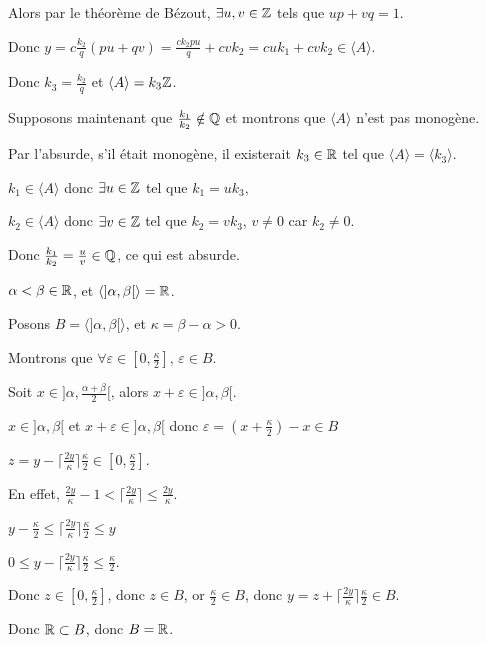 \begin{exemple}
    Alors par le théorème de Bézout, $\exists u, v \in \mathbb{Z}$ tels que $up + vq = 1$.

    Donc $\displaystyle y = c \frac{k_2} q (pu + qv) = \frac{c k_2 p u}{q} + cv k_2 = c u k_1 + cv k_2 \in \langle A \rangle$.

    Donc $k_3 = \frac{k_2} q$ et $\langle A \rangle = k_3 \mathbb{Z}$.

    \svspace Supposons maintenant que $\frac{k_1}{k_2} \notin \mathbb{Q}$ et montrons 
    que $\langle A \rangle$ n'est pas monogène.

    Par l'absurde, s'il était monogène, il existerait $k_3 \in \mathbb{R}$ tel que
    $\langle A \rangle = \langle k_3 \rangle$. 

    $k_1 \in \langle A \rangle$ donc $\exists u \in \mathbb{Z}$ tel que $k_1 = u k_3$, 

    $k_2 \in \langle A \rangle$ donc $\exists v \in \mathbb{Z}$ tel que $k_2 = v k_3$, $v \neq 0$ car $k_2 \neq 0$.

    Donc $\frac{k_1}{k_2} = \frac u v \in \mathbb{Q}$, ce qui est absurde.


    $\alpha < \beta \in \mathbb{R}$, et $\langle ]\alpha, \beta[ \rangle = \mathbb{R}$.

    Posons $B = \langle ]\alpha, \beta[ \rangle$, et $\kappa = \beta - \alpha > 0$.

    Montrons que $\forall \varepsilon \in [0, \frac{\kappa} 2], \, \varepsilon \in B$.

    Soit $x \in ]\alpha, \frac{\alpha + \beta} 2[$, alors $x + \varepsilon \in ]\alpha, \beta[$.

    $x \in ]\alpha, \beta[$ et $x + \varepsilon \in ]\alpha, \beta[$ donc $\varepsilon = \left(x + \frac{\kappa}{2}\right) - x \in B$

    $z = y - \lceil \frac {2y} \kappa \rceil \frac \kappa 2 \in [0, \frac \kappa 2]$. 

    En effet, $\frac{2y} \kappa - 1 < \lceil \frac {2y} \kappa \rceil \leq \frac {2y} \kappa$.

    $y - \frac{\kappa }{2 } \leqslant \lceil \frac {2y} \kappa \rceil \frac \kappa 2 \leqslant y$

    $0 \leqslant y - \lceil \frac {2y} \kappa \rceil \frac \kappa 2 \leqslant \frac \kappa 2$.

    Donc $z \in [0, \frac \kappa 2]$, donc $z \in B$, or $\frac \kappa 2 \in B$, donc $y = z + \lceil \frac {2y} \kappa \rceil \frac \kappa 2 \in B$.

    Donc $\mathbb{R} \subset B$, donc $B = \mathbb{R}$.


\end{exemple}
